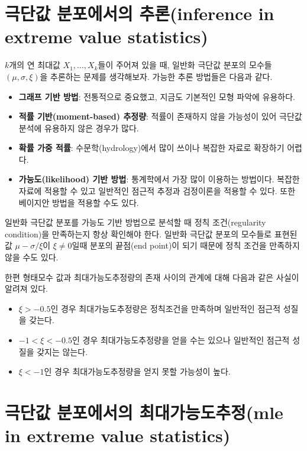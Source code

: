 \documentclass[b5paper,]{scrbook}
\theoremstyle{plain}
\theoremstyle{definition}
\numberwithin{equation}{section}
\begin{document}
\section{극단값 분포에서의 추론(inference in extreme value
statistics)}\label{--inference-in-extreme-value-statistics}

\(k\)개의 연 최대값 \(X_{1}, \ldots , X_{k}\)들이 주어져 있을 때, 일반화
극단값 분포의 모수들 \((\mu, \sigma, \xi)\)을 추론하는 문제를
생각해보자. 가능한 추론 방법들은 다음과 같다.

\begin{itemize}
\item
  \textbf{그래프 기반 방법}: 전통적으로 중요했고, 지금도 기본적인 모형
  파악에 유용하다.
\item
  \textbf{적률 기반(moment-based) 추정량}: 적률이 존재하지 않을 가능성이
  있어 극단값 분석에 유용하지 않은 경우가 많다.
\item
  \textbf{확률 가중 적률}: 수문학(hydrology)에서 많이 쓰이나 복잡한
  자료로 확장하기 어렵다.
\item
  \textbf{가능도(likelihood) 기반 방법}: 통계학에서 가장 많이 이용하는
  방법이다. 복잡한 자료에 적용할 수 있고 일반적인 점근적 추정과
  검정이론을 적용할 수 있다. 또한 베이지안 방법을 적용할 수도 있다.
\end{itemize}

일반화 극단값 분포를 가능도 기반 방법으로 분석할 때 정칙 조건(regularity
condition)을 만족하는지 항상 확인해야 한다. 일반화 극단값 분포의
모수들로 표현된 값 \(\mu-\sigma/\xi\)이 \(\xi\neq 0\)일때 분포의
끝점(end point)이 되기 때문에 정칙 조건을 만족하지 않을 수도
있다.\citep{Smith1985}

한편 형태모수 값과 최대가능도추정량의 존재 사이의 관계에 대해 다음과
같은 사실이 알려져 있다.

\begin{itemize}
\item
  \(\xi > -0.5\)인 경우 최대가능도추정량은 정칙조건을 만족하며 일반적인
  점근적 성질을 갖는다.
\item
  \(-1 < \xi < -0.5\)인 경우 최대가능도추정량을 얻을 수는 있으나
  일반적인 점근적 성질을 갖지는 않는다.
\item
  \(\xi < -1\)인 경우 최대가능도추정량을 얻지 못할 가능성이 높다.
\end{itemize}

\section{극단값 분포에서의 최대가능도추정(mle in extreme value
statistics)}\label{--mle-in-extreme-value-statistics}
\end{document}
